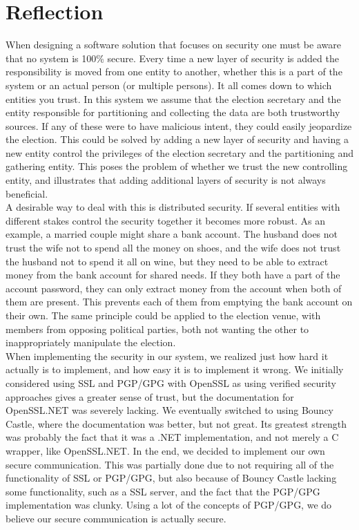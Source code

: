 \documentclass[a4paper]{report}
\begin{document}
\chapter{Reflection}
When designing a software solution that focuses on security one must be aware that no system is 100\% secure. Every time a new layer of security is added the responsibility is moved from one entity to another, whether this is a part of the system or an actual person (or multiple persons). It all comes down to which entities you trust. In this system we assume that the election secretary and the entity responsible for partitioning and collecting the data are both trustworthy sources. If any of these were to have malicious intent, they could easily jeopardize the election. This could be solved by adding a new layer of security and having a new entity control the privileges of the election secretary and the partitioning and gathering entity. This poses the problem of whether we trust the new controlling entity, and illustrates that adding additional layers of security is not always beneficial. \\

A desirable way to deal with this is distributed security. If several entities with different stakes control the security together it becomes more robust. As an example, a married couple might share a bank account. The husband does not trust the wife not to spend all the money on shoes, and the wife does not trust the husband not to spend it all on wine, but they need to be able to extract money from the bank account for shared needs. If they both have a part of the account password, they can only extract money from the account when both of them are present. This prevents each of them from emptying the bank account on their own. The same principle could be applied to the election venue, with members from opposing political parties, both not wanting the other to inappropriately manipulate the election.\\

When implementing the security in our system, we realized just how hard it actually is to implement, and how easy it is to implement it wrong. We initially considered using SSL and PGP/GPG with OpenSSL \cite{openssl} as using verified security approaches gives a greater sense of trust, but the documentation for OpenSSL.NET \cite{sslnet} was severely lacking. We eventually switched to using Bouncy Castle, where the documentation was better, but not great. Its greatest strength was probably the fact that it was a .NET implementation, and not merely a C wrapper, like OpenSSL.NET. In the end, we decided to implement our own secure communication. This was partially done due to not requiring all of the functionality of SSL or PGP/GPG, but also because of Bouncy Castle lacking some functionality, such as a SSL server, and the fact that the PGP/GPG implementation was clunky. Using a lot of the concepts of PGP/GPG, we do believe our secure communication is actually secure.
\end{document}
